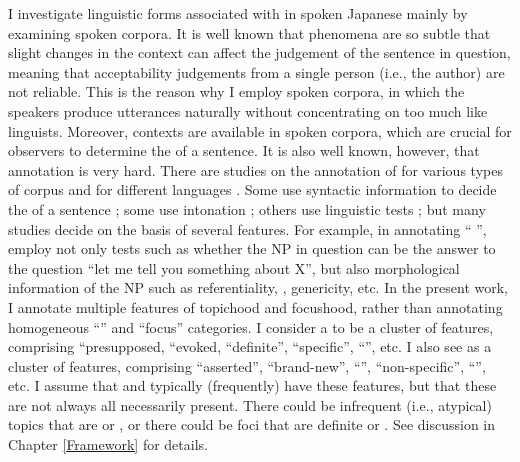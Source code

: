 I investigate linguistic forms associated with  in spoken Japanese mainly by examining spoken corpora.
It is well known that  phenomena are so subtle
that slight changes in the context can affect the judgement of the sentence in question, meaning that
acceptability judgements from a single person (i.e., the author) are not reliable.
This is the reason why I employ spoken corpora, in which
the speakers produce utterances naturally without concentrating on  too much like linguists.
Moreover, contexts are available in spoken corpora,
which are crucial for observers to determine the  of a sentence.
It is also well known, however,
that  annotation is very hard.
There are studies on the annotation of  for various types of corpus and for different languages
\cite{hajicovaetal00,calhounetal05,gotzeetal07,ritzetal08,chiarcosetal11}.
Some use syntactic information to decide the  of a sentence \cite{hajicovaetal00};
some use intonation \cite{calhounetal05};
others use linguistic tests \cite{gotzeetal07,chiarcosetal11}; but many studies decide on the basis of several features.
For example, in annotating `` '',
 employ not only tests such as whether the NP in question can be the answer to the question ``let me tell you something about X'',
but also morphological information of the NP
such as referentiality, , genericity, etc.
In the present work, I annotate multiple features of topichood and focushood,
rather than annotating homogeneous ``'' and ``focus'' categories.
I consider a  to be a cluster of features, comprising ``presupposed, ``evoked, ``definite'', ``specific'', ``'', etc. I also see  as a cluster of features, comprising ``asserted'', ``brand-new'', ``'', ``non-specific'', ``'', etc.
I assume that  and  typically (frequently) have these features, but that these are not always all necessarily present. There could be infrequent (i.e., atypical) topics that are  or , or there could be foci that are definite or .
See discussion in Chapter \ref{Framework} for details.

